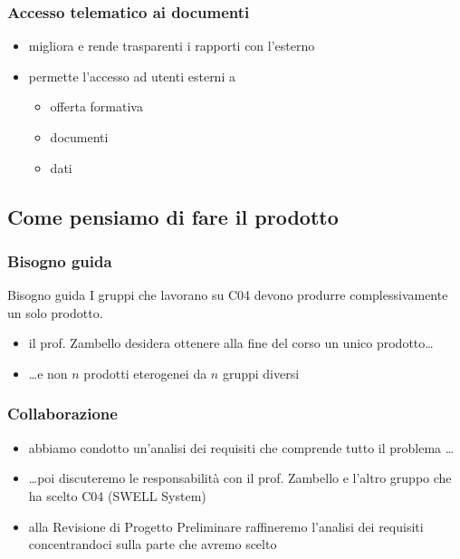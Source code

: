 \begin{frame}
\frametitle{Accesso telematico ai documenti}

\begin{itemize}
\item migliora e rende trasparenti i rapporti con l'esterno
\item permette l'accesso ad utenti esterni a

\begin{itemize}
\item offerta formativa
\item documenti
\item dati
\end{itemize}

\end{itemize}

\end{frame}

\subsection{Come pensiamo di fare il prodotto}

\begin{frame}
\frametitle{Bisogno guida}

\begin{block}{Bisogno guida}
I gruppi che lavorano su C04 devono produrre complessivamente un solo prodotto.
\end{block}

\begin{itemize}
\item il prof. Zambello desidera ottenere alla fine del corso \alert{un unico prodotto}\ldots
\item \ldots e non $n$ prodotti eterogenei da $n$ gruppi diversi
\end{itemize}

\end{frame}

\begin{frame}
\frametitle{Collaborazione}

\begin{itemize}
\item abbiamo condotto un'analisi dei requisiti che comprende tutto il problema \ldots
\item \ldots poi discuteremo le responsabilità con il prof. Zambello e l'altro gruppo che ha scelto C04 (SWELL System)
\item alla Revisione di Progetto Preliminare raffineremo l'analisi dei requisiti concentrandoci sulla parte che avremo scelto
\end{itemize}

\end{frame}

